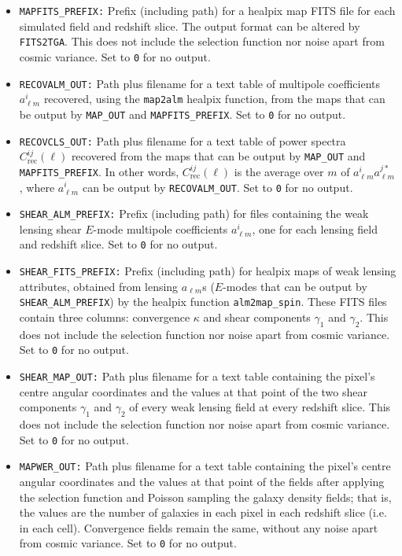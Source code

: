 \documentclass[12pt]{book} %
\newcommand{\nv}[1]{\mathrm{#1}}                 %
\begin{document}
\begin{itemize}
\item {\tt MAPFITS\_PREFIX:} Prefix (including path) for a {\sc healpix} map FITS file for each 
  simulated field and redshift slice. The output format can be altered by {\tt FITS2TGA}. This does not include 
  the selection function nor noise apart from cosmic variance. Set to {\tt 0} for no output. 
  
\item {\tt RECOVALM\_OUT:} Path plus filename for a text table of multipole coefficients 
  $a^{i}_{\ell m}$ recovered, using the {\tt map2alm} {\sc healpix} function, 
  from the maps that can be output by {\tt MAP\_OUT} and 
  {\tt MAPFITS\_PREFIX}. Set to {\tt 0} for no output. 

\item {\tt RECOVCLS\_OUT:} Path plus filename for a text table of power spectra 
  $C_{\nv{rec}}^{ij}(\ell)$ recovered from the maps that can be output by {\tt MAP\_OUT} and 
  {\tt MAPFITS\_PREFIX}. In other words, $C_{\nv{rec}}^{ij}(\ell)$ is the average over $m$ 
  of $a^{i}_{\ell m}a^{j*}_{\ell m}$, where $a^{i}_{\ell m}$ can be output by {\tt RECOVALM\_OUT}.
  Set to {\tt 0} for no output. 

\item {\tt SHEAR\_ALM\_PREFIX:} Prefix (including path) for files containing the weak lensing 
  shear $E$-mode multipole coefficients $a^{i}_{\ell m}$, one for each lensing field and redshift 
  slice. Set to {\tt 0} for no output. 

\item {\tt SHEAR\_FITS\_PREFIX:} Prefix (including path) for {\sc healpix} maps 
  of weak lensing attributes, obtained from lensing $a_{\ell m}$s ($E$-modes that can be 
  output by {\tt SHEAR\_ALM\_PREFIX}) by the {\sc healpix} function {\tt alm2map\_spin}. 
  These FITS files contain three columns: convergence $\kappa$ and shear components 
  $\gamma_1$ and $\gamma_2$. This does not include the selection function nor noise apart 
  from cosmic variance. Set to {\tt 0} for no output. 

\item {\tt SHEAR\_MAP\_OUT:} Path plus filename for a text table containing the pixel's 
  centre angular coordinates and the values at that point of the two shear components  
  $\gamma_1$ and $\gamma_2$ of every weak lensing field at every redshift slice. 
  This does not include the selection function nor noise apart from cosmic variance. 
  Set to {\tt 0} for no output. 

\item {\tt MAPWER\_OUT:} Path plus filename for a text table containing the pixel's 
  centre angular coordinates and the values at that point of the fields after applying 
  the selection function and Poisson sampling the galaxy density fields; that is, the 
  values are the number of galaxies in each pixel in each redshift slice (i.e. in each 
  cell). Convergence fields remain the same, without any noise apart from 
  cosmic variance. Set to {\tt 0} for no output. 


\end{itemize}
\end{document}
